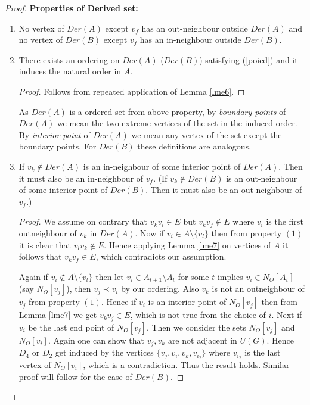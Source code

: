 \documentclass{article}
\theoremstyle{definition}
\numberwithin{equation}{section}
\begin{document}
\begin{proof}
\vspace{1em}

\noindent \textbf{Properties of Derived set:}
\vspace{0.6em}

\begin{enumerate}
\item No vertex of $Der(A)$ except $v_{f}$ has an out-neighbour outside $Der(A)$ and
no vertex of $Der(B)$ except $v_{f}$ has an in-neighbour outside $Der(B)$.

\item There exists an ordering on $Der(A)$ ($Der(B)$) satisfying (\ref{poicd}) and it induces the natural order in $A$.\label{p2}

\begin{proof}
Follows from repeated application of Lemma \ref{lme6}.
\end{proof}


\noindent  As $Der(A)$ is a ordered set from above property, by {\em boundary points} of $Der(A)$ we mean the two extreme vertices of the set in the induced order. By {\em interior point} of $Der(A)$ we mean any vertex of the set except the boundary points.
For $Der(B)$ these definitions are analogous. 

\item If $v_{k}\notin Der(A)$ is an in-neighbour of some interior point of $Der(A)$. Then it must also be an in-neighbour of $v_{f}$. (If $v_{k}\notin Der(B)$ is an out-neighbour of some interior point of $Der(B)$. Then it must also be an out-neighbour of $v_{f}$.) 


\begin{proof}
We assume on contrary that $v_{k}v_{i}\in E$ but $v_{k}v_{f}\notin E$ where 
 $v_{i}$ is the first outneighbour of $v_{k}$ in $Der(A)$. Now if $v_{i}\in A\setminus \{v_{l}\}$ then from property $(1)$ it is clear that $v_{l}v_{k}\notin E$. Hence applying Lemma \ref{lme7} on vertices of $A$ it follows that $v_{k}v_{f}\in E$, which contradicts our assumption.
 
Again if $v_{i}\notin A\setminus \{v_{l}\}$ then let $v_{i}\in A_{t+1}\setminus A_{t}$ for some $t$ implies $v_{i}\in N_{O}[A_{t}]$ (say $N_{O}[v_{j}]$), then $v_{j}\prec v_{i}$ by our ordering. Also $v_{k}$ is not an outneighbour of 
$v_{j}$ from property $(1)$. Hence if $v_{i}$ is an interior point of $N_{O}[v_{j}]$ then from Lemma \ref{lme7} we get $v_{k}v_{j}\in E$, which is not true from the choice of $i$. Next if $v_{i}$ be the last end point of $N_{O}[v_{j}]$. Then we consider the sets $N_{O}[v_{j}]$ and $N_{O}[v_{i}]$. Again one can show that $v_{j},v_{k}$ are not adjacent in $U(G)$. Hence $D_{4}$ or $D_{2}$ get induced by the vertices $\{v_{j},v_{i},v_{k},v_{i_{2}}\}$ where $v_{i_{2}}$ is the last vertex of $N_{O}[v_{i}]$, which is a contradiction. Thus the result holds.
Similar proof will follow for the case of $Der(B)$. 
\end{proof}



\end{enumerate}
\end{proof}
\end{document}
